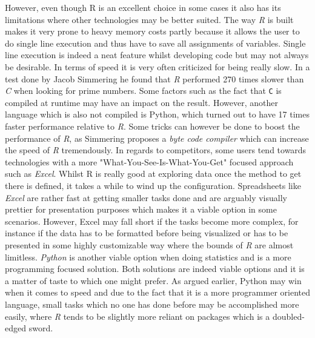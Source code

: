 \documentclass[Report.tex]{subfiles}
\begin{document}
 However, even though R is an excellent choice in some cases it also has its limitations where other technologies may be better suited. The way \textit{R} is built makes it very prone to heavy memory costs partly because it allows the user to do single line execution and thus have to save all assignments of variables. Single line execution is indeed a neat feature whilst developing code but may not always be desirable.  In terms of speed it is very often criticized for being really slow. In a test done by Jacob Simmering \cite{R} he found that \textit{R} performed 270 times slower than \textit{C} when looking for prime numbers. Some factors such as the fact that \texttt{C} is compiled at runtime may have an impact on the result. However, another language which is also not compiled is Python, which turned out to have 17 times faster performance relative to \textit{R}. Some tricks can however be done to boost the performance of \textit{R}, as Simmering proposes a \textit{byte code compiler} which can increase the speed of \textit{R} tremendously. In regards to competitors, some users tend towards technologies with a more "What-You-See-Is-What-You-Get" focused approach such as \textit{Excel}. Whilst R is really good at exploring data once the method to get there is defined, it takes a while to wind up the configuration. Spreadsheets like \textit{Excel} are rather fast at getting smaller tasks done and are arguably visually prettier for presentation purposes which makes it a viable option in some scenarios. However, Excel may fall short if the tasks become more complex, for instance if the data has to be formatted before being visualized or has to be presented in some highly customizable way where the bounds of \textit{R} are almost limitless. \textit{Python} is another viable option when doing statistics and is a more programming focused solution. Both solutions are indeed viable options and it is a matter of taste to which one might prefer. As argued earlier, Python may win when it comes to speed and due to the fact that it is a more programmer oriented language, small tasks which no one has done before may be accomplished more easily, where \textit{R} tends to be slightly more reliant on packages which is a doubled-edged sword.
\end{document}

